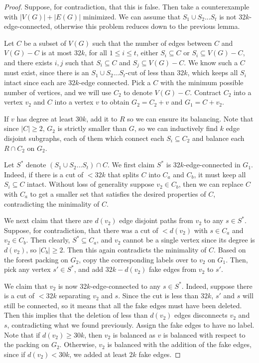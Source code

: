 \documentclass{article}
\begin{document}
\begin{proof}
    Suppose, for contradiction, that this is false. Then take a counterexample with $|V(G)|+|E(G)|$ minimized. We can assume that $S_1 \cup S_2...S_t$ is not $32k$-edge-connected, otherwise this problem reduces down to the previous lemma.

    Let $C$ be a subset of $V(G)$ such that the number of edges between $C$ and $V(G)-C$ is at most $32k$, for all $1 \leq i \leq t$, either $S_i \subseteq C$ or $S_i \subseteq V(G)-C$, and there exists $i,j$ such that $S_i \subseteq C$ and $S_j \subseteq V(G)-C$. We know such a $C$ must exist, since there is an $S_1 \cup S_2...S_t$-cut of less than $32k$, which keeps all $S_i$ intact since each are $32k$-edge connected. Pick a $C$ with the minimum possible number of vertices, and we will use $C_2$ to denote $V(G)-C$. Contract $C_2$ into a vertex $v_2$ and $C$ into a vertex $v$ to obtain $G_2 = C_2+v$ and $G_1 = C+v_2$. 

    If $v$ has degree at least $30k$, add it to $R$ so we can ensure its balancing. Note that since $|C| \geq 2$, $G_2$ is strictly smaller than $G$, so we can inductively find $k$ edge disjoint subgraphs, each of them which connect each $S_i \subseteq C_2$ and balance each $R \cap C_2$ on $G_2$. 

    Let $S^*$ denote $(S_1 \cup S_2...S_t) \cap C$. We first claim $S^*$ is $32k$-edge-connected in $G_1$. Indeed, if there is a cut of $< 32k$ that splits $C$ into $C_a$ and $C_b$, it must keep all $S_i \subseteq C$ intact. Without loss of generality suppose $v_2 \in C_b$, then we can replace $C$ with $C_a$ to get a smaller set that satisfies the desired properties of $C$, contradicting the minimality of $C$.

    We next claim that there are $d(v_2)$ edge disjoint paths from $v_2$ to any $s \in S^*$. Suppose, for contradiction, that there was a cut of $< d(v_2)$ with $s \in C_a$ and $v_2 \in C_b$. Then clearly, $S^* \subseteq C_a$, and $v_2$ cannot be a single vertex since its degree is $d(v_2)$, so $|C_b| \geq 2$. Then this again contradicts the minimality of $C$. Based on the forest packing on $G_2$, copy the corresponding labels over to $v_2$ on $G_1$. Then, pick any vertex $s' \in S^*$, and add $32k-d(v_2)$ fake edges from $v_2$ to $s'$. 

    We claim that $v_2$ is now $32k$-edge-connected to any $s \in S^*$. Indeed, suppose there is a cut of $< 32k$ separating $v_2$ and $s$. Since the cut is less than $32k$, $s'$ and $s$ will still be connected, so it means that all the fake edges must have been deleted. Then this implies that the deletion of less than $d(v_2)$ edges disconnects $v_2$ and $s$, contradicting what we found previously. Assign the fake edges to have no label. Note that if $d(v_2) \geq 30k$, then $v_2$ is balanced as $v$ is balanced with respect to the packing on $G_2$. Otherwise, $v_2$ is balanced with the addition of the fake edges, since if $d(v_2) < 30k$, we added at least $2k$ fake edges. 


\end{proof}
\end{document}
